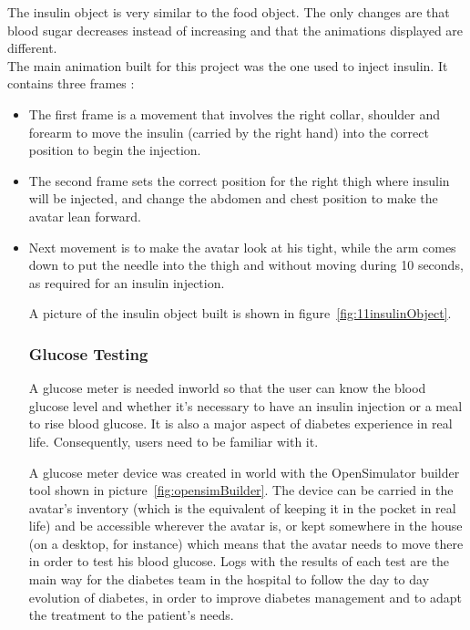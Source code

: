 The insulin object is very similar to the food object. The only changes are that blood sugar decreases instead of increasing and that the animations displayed are different.\\
The main animation built for this project was the one used to inject insulin. It contains three frames :
\begin{itemize} 
\item The first frame is a movement that involves the right collar, shoulder and forearm to move the insulin (carried by the right hand) into the correct position to begin the injection. 
\item The second frame sets the correct position for the right thigh where insulin will be injected, and change the abdomen and chest position to make the avatar lean forward. \item Next movement is to make the avatar look at his tight, while the arm comes down to put the needle into the thigh and without moving during 10 seconds, as required for an insulin injection.
\begin{itemize}

A picture of the insulin object built is shown in figure~\ref{fig:11insulinObject}.





	\subsubsection{Glucose Testing}

\iffalse
A glucose meter is needed inworld so that the user can know the blood glucose level and whether it's necessary to have an insulin injection or a meal to rise blood glucose. It is also a major aspect of diabetes experience in real life. Consequently, users need to be familiar with it.

A glucose meter device was created in world with the OpenSimulator builder tool shown in picture~\ref{fig:opensimBuilder}. The device can be carried in the avatar's inventory 
(which is the equivalent of keeping it in the pocket in real life) and be accessible wherever the avatar is, 
or kept somewhere in the house (on a desktop, for instance) which means that the avatar needs to move there in order to test his blood glucose. 
Logs with the results of each test are the main way for the diabetes team in the hospital to follow the day to day evolution of diabetes, in order to improve diabetes management and to adapt the treatment to the patient's needs. \\


\end{itemize}
\end{itemize}
